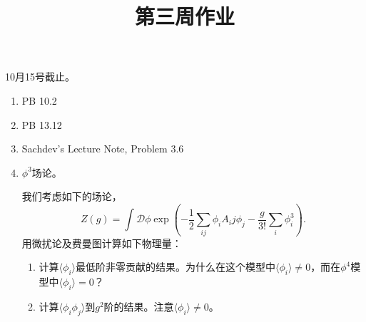 \documentclass[12pt,aps,pra,notitlepage]{revtex4-1}
\begin{document}
\title{第三周作业}
\maketitle
\begin{center}
  10月15号截止。
\end{center}
\begin{enumerate}
  \item PB 10.2
  \item PB 13.12
  \item Sachdev's Lecture Note, Problem 3.6
  \item $\phi^3$场论。

  我们考虑如下的场论，
  \[Z(g)=\int\mathcal D\phi \exp\left(
  -\frac12\sum_{ij}\phi_iA_ij\phi_j-\frac g{3!}\sum_i\phi_i^3\right).\]
  用微扰论及费曼图计算如下物理量：
  \begin{enumerate}
    \item 计算$\langle\phi_i\rangle$最低阶非零贡献的结果。为什么在这个模型中$\langle\phi_i\rangle\neq0$，而在$\phi^4$模型中$\langle\phi_i\rangle=0$？
    \item 计算$\langle\phi_i\phi_j\rangle$到$g^2$阶的结果。注意$\langle\phi_i\rangle\neq0$。
  \end{enumerate}
\end{enumerate}
\end{document}

